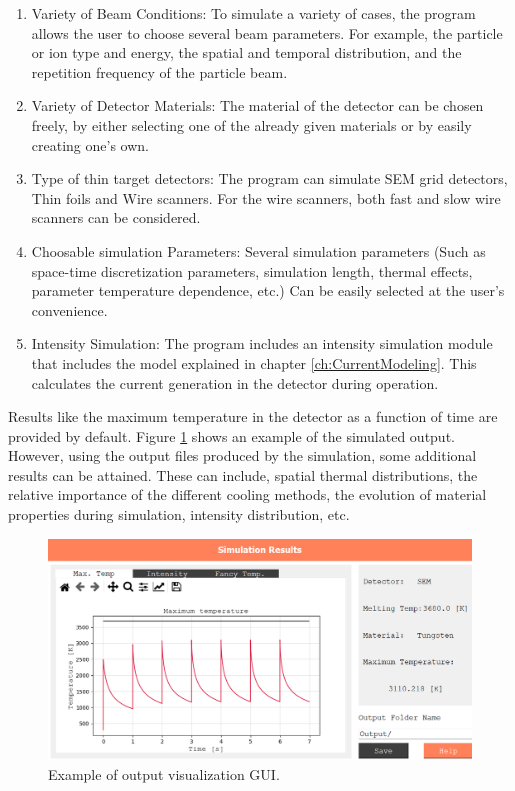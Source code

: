 \begin{enumerate}
    \item Variety of Beam Conditions: To simulate a variety of cases, the program allows the user to choose several beam parameters. For example, the particle or ion type and energy, the spatial and temporal distribution, and the repetition frequency of the particle beam. 
    \item Variety of Detector Materials: The material of the detector can be chosen freely, by either selecting one of the already given materials or by easily creating one's own. 
    \item Type of thin target detectors: The program can simulate SEM grid detectors, Thin foils and Wire scanners. For the wire scanners, both fast and slow wire scanners can be considered. 
    \item Choosable simulation Parameters:  Several simulation parameters (Such as space-time discretization parameters, simulation length, thermal effects, parameter temperature dependence, etc.) Can be easily selected at the user's convenience. 
    \item Intensity Simulation: The program includes an intensity simulation module that includes the model explained in chapter \ref{ch:CurrentModeling}. This calculates the current generation in the detector during operation. 
\end{enumerate}

Results like the maximum temperature in the detector as a function of time are provided by default. Figure \ref{fig:GUIResults} shows an example of the simulated output. However, using the output files produced by the simulation, some additional results can be attained. These can include, spatial thermal distributions, the relative importance of the different cooling methods, the evolution of material properties during simulation, intensity distribution, etc. 

\begin{figure}[h]
    \centering
    \includegraphics[width=0.9\columnwidth]{PyTT_GUI/PyTTresults.png}
    \caption{Example of output visualization GUI.}
    \label{fig:GUIResults}
\end{figure}

